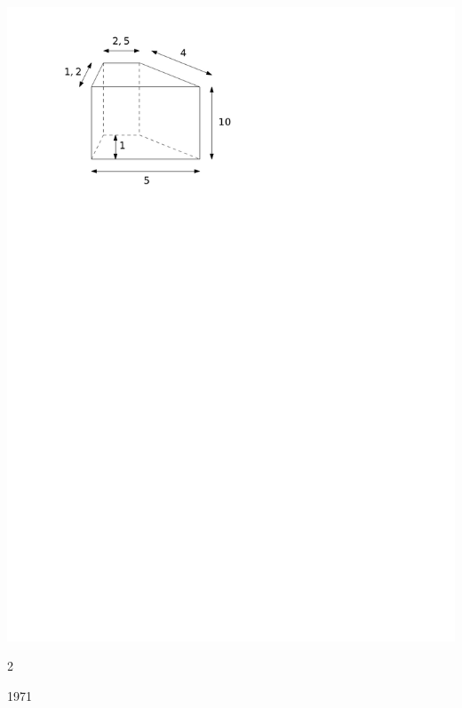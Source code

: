 \documentclass[a4paper,11pt]{report}
\begin{document}
\begin{exop}
{\begin{tasks}
    \task ~\\ \includegraphics[scale=0.5]{media/gm-02/prisme-trap.pdf}
\end{tasks}
}{2}    
\end{exop}






\begin{QSJ}{197}{1}
\end{QSJ}
\end{document}
